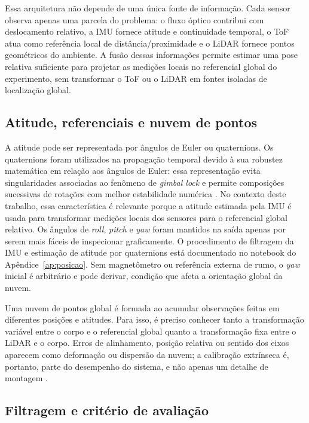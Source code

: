 Essa arquitetura não depende de uma única fonte de informação. Cada sensor observa apenas uma parcela do problema: o fluxo óptico contribui com deslocamento relativo, a IMU fornece atitude e continuidade temporal, o ToF atua como referência local de distância/proximidade e o LiDAR fornece pontos geométricos do ambiente. A fusão dessas informações permite estimar uma pose relativa suficiente para projetar as medições locais no referencial global do experimento, sem transformar o ToF ou o LiDAR em fontes isoladas de localização global.

\subsection{Atitude, referenciais e nuvem de pontos}

A atitude pode ser representada por ângulos de Euler ou quaternions. Os quaternions foram utilizados na propagação temporal devido à sua robustez matemática em relação aos ângulos de Euler: essa representação evita singularidades associadas ao fenômeno de \textit{gimbal lock} e permite composições sucessivas de rotações com melhor estabilidade numérica \parencite{diebel2006,siciliano2009robotics}. No contexto deste trabalho, essa característica é relevante porque a atitude estimada pela IMU é usada para transformar medições locais dos sensores para o referencial global relativo. Os ângulos de \textit{roll}, \textit{pitch} e \textit{yaw} foram mantidos na saída apenas por serem mais fáceis de inspecionar graficamente. O procedimento de filtragem da IMU e estimação de atitude por quaternions está documentado no notebook do Apêndice~\ref{ap:posicao}. Sem magnetômetro ou referência externa de rumo, o \textit{yaw} inicial é arbitrário e pode derivar, condição que afeta a orientação global da nuvem.

Uma nuvem de pontos global é formada ao acumular observações feitas em diferentes posições e atitudes. Para isso, é preciso conhecer tanto a transformação variável entre o corpo e o referencial global quanto a transformação fixa entre o LiDAR e o corpo. Erros de alinhamento, posição relativa ou sentido dos eixos aparecem como deformação ou dispersão da nuvem; a calibração extrínseca é, portanto, parte do desempenho do sistema, e não apenas um detalhe de montagem \parencite{siciliano2009robotics,rusu20113d}.

\subsection{Filtragem e critério de avaliação}

